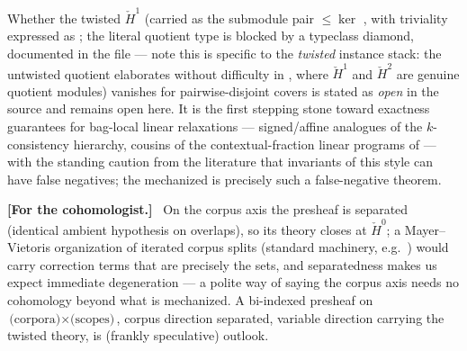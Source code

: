 \documentclass[11pt]{article}
\newenvironment{cohomaside}
  {\par\medskip\noindent\begingroup\small
   \textbf{[For the cohomologist.]}\ }
  {\endgroup\par\medskip}
\newcommand{\Hech}{\check H}
\begin{document}
Whether the twisted $\Hech^1$ (carried as the submodule pair
 $\le \ker$ , with
triviality expressed as ; the literal
quotient type is blocked by a typeclass diamond, documented in the
file --- note this is specific to the \emph{twisted} instance stack:
the untwisted quotient  elaborates without difficulty in
, where $\Hech^1$ and $\Hech^2$ are genuine
quotient modules) vanishes for pairwise-disjoint covers is stated as \emph{open}
in the source and remains open here.  It is the first stepping stone
toward exactness guarantees for bag-local linear relaxations ---
signed/affine analogues of the $k$-consistency hierarchy, cousins of
the contextual-fraction linear programs of
\citet{abramsky2017contextualfraction} --- with the standing caution
from the literature
\citep{caru2017cohomology,okay2017topological,aasnaess2022comparing}
that invariants of this style can have false negatives; the
mechanized  is precisely such a
false-negative theorem.

\begin{cohomaside}
On the corpus axis the presheaf is separated (identical ambient
hypothesis on overlaps), so its theory closes at $\Hech^0$; a
Mayer--Vietoris organization of iterated corpus splits (standard
machinery, e.g.\ \citealp{bott1982forms}) would carry correction
terms that are precisely the  sets, and
separatedness makes us expect immediate degeneration --- a polite
way of saying the corpus axis needs no cohomology beyond what is
mechanized.  A bi-indexed presheaf on $\text{(corpora)} \times
\text{(scopes)}$, corpus direction separated, variable direction
carrying the twisted theory, is (frankly speculative) outlook.
\end{cohomaside}



\end{document}
